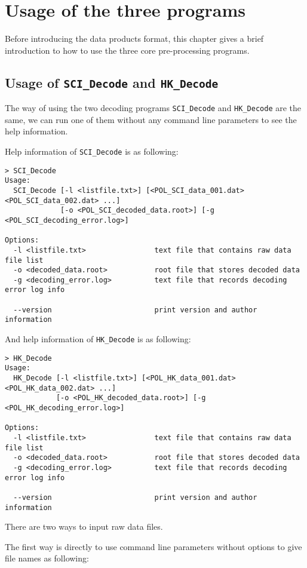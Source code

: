 \documentclass[a4paper, 12pt, onecolumn]{article}
\begin{document}
\section{Usage of the three programs}
Before introducing the data products format, this chapter gives a brief introduction to how to use the three core pre-processing programs.

\subsection{Usage of \texttt{SCI\_Decode} and \texttt{HK\_Decode}}
The way of using the two decoding programs \texttt{SCI\_Decode} and \texttt{HK\_Decode} are the same, we can run one of them without any command line parameters to see the help information.

Help information of \texttt{SCI\_Decode} is as following:
\begin{Verbatim}[fontsize=\scriptsize, frame=single]
> SCI_Decode
Usage:
  SCI_Decode [-l <listfile.txt>] [<POL_SCI_data_001.dat> <POL_SCI_data_002.dat> ...]
             [-o <POL_SCI_decoded_data.root>] [-g <POL_SCI_decoding_error.log>]

Options:
  -l <listfile.txt>                text file that contains raw data file list
  -o <decoded_data.root>           root file that stores decoded data
  -g <decoding_error.log>          text file that records decoding error log info

  --version                        print version and author information
\end{Verbatim}

And help information of \texttt{HK\_Decode} is as following:
\begin{Verbatim}[fontsize=\scriptsize, frame=single]
> HK_Decode
Usage:
  HK_Decode [-l <listfile.txt>] [<POL_HK_data_001.dat> <POL_HK_data_002.dat> ...]
            [-o <POL_HK_decoded_data.root>] [-g <POL_HK_decoding_error.log>]

Options:
  -l <listfile.txt>                text file that contains raw data file list
  -o <decoded_data.root>           root file that stores decoded data
  -g <decoding_error.log>          text file that records decoding error log info

  --version                        print version and author information
\end{Verbatim}

There are two ways to input raw data files.

The first way is directly to use command line parameters without options to give file names as following:
\end{document}
